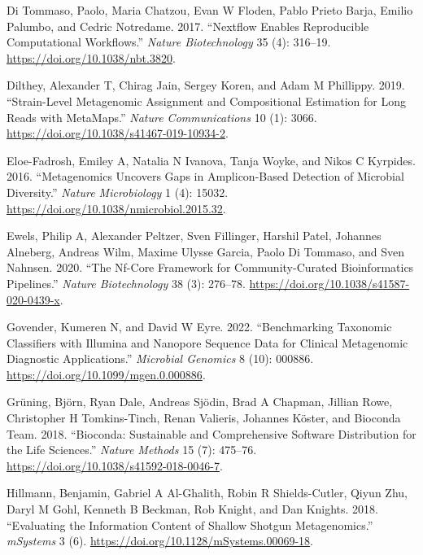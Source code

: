\documentclass[
]{article}
\newlength{\cslhangindent}
\newlength{\cslentryspacingunit} %
\newenvironment{CSLReferences}[2] %
 {%
  \setlength{\parindent}{0pt}
  \ifodd #1
  \let\oldpar\par
  \def\par{\hangindent=\cslhangindent\oldpar}
  \fi
  \setlength{\parskip}{#2\cslentryspacingunit}
 }%
 {}
\begin{document}
\begin{CSLReferences}{1}{0}
\leavevmode{}%
Di Tommaso, Paolo, Maria Chatzou, Evan W Floden, Pablo Prieto Barja,
Emilio Palumbo, and Cedric Notredame. 2017. {``Nextflow Enables
Reproducible Computational Workflows.''} \emph{Nature Biotechnology} 35
(4): 316--19. \url{https://doi.org/10.1038/nbt.3820}.

\leavevmode{}%
Dilthey, Alexander T, Chirag Jain, Sergey Koren, and Adam M Phillippy.
2019. {``Strain-Level Metagenomic Assignment and Compositional
Estimation for Long Reads with {MetaMaps}.''} \emph{Nature
Communications} 10 (1): 3066.
\url{https://doi.org/10.1038/s41467-019-10934-2}.

\leavevmode{}%
Eloe-Fadrosh, Emiley A, Natalia N Ivanova, Tanja Woyke, and Nikos C
Kyrpides. 2016. {``Metagenomics Uncovers Gaps in Amplicon-Based
Detection of Microbial Diversity.''} \emph{Nature Microbiology} 1 (4):
15032. \url{https://doi.org/10.1038/nmicrobiol.2015.32}.

\leavevmode{}%
Ewels, Philip A, Alexander Peltzer, Sven Fillinger, Harshil Patel,
Johannes Alneberg, Andreas Wilm, Maxime Ulysse Garcia, Paolo Di Tommaso,
and Sven Nahnsen. 2020. {``The Nf-Core Framework for Community-Curated
Bioinformatics Pipelines.''} \emph{Nature Biotechnology} 38 (3):
276--78. \url{https://doi.org/10.1038/s41587-020-0439-x}.

\leavevmode{}%
Govender, Kumeren N, and David W Eyre. 2022. {``Benchmarking Taxonomic
Classifiers with Illumina and Nanopore Sequence Data for Clinical
Metagenomic Diagnostic Applications.''} \emph{Microbial Genomics} 8
(10): 000886. \url{https://doi.org/10.1099/mgen.0.000886}.

\leavevmode{}%
Grüning, Björn, Ryan Dale, Andreas Sjödin, Brad A Chapman, Jillian Rowe,
Christopher H Tomkins-Tinch, Renan Valieris, Johannes Köster, and
Bioconda Team. 2018. {``Bioconda: Sustainable and Comprehensive Software
Distribution for the Life Sciences.''} \emph{Nature Methods} 15 (7):
475--76. \url{https://doi.org/10.1038/s41592-018-0046-7}.

\leavevmode{}%
Hillmann, Benjamin, Gabriel A Al-Ghalith, Robin R Shields-Cutler, Qiyun
Zhu, Daryl M Gohl, Kenneth B Beckman, Rob Knight, and Dan Knights. 2018.
{``Evaluating the Information Content of Shallow Shotgun
Metagenomics.''} \emph{mSystems} 3 (6).
\url{https://doi.org/10.1128/mSystems.00069-18}.


\end{CSLReferences}
\end{document}
